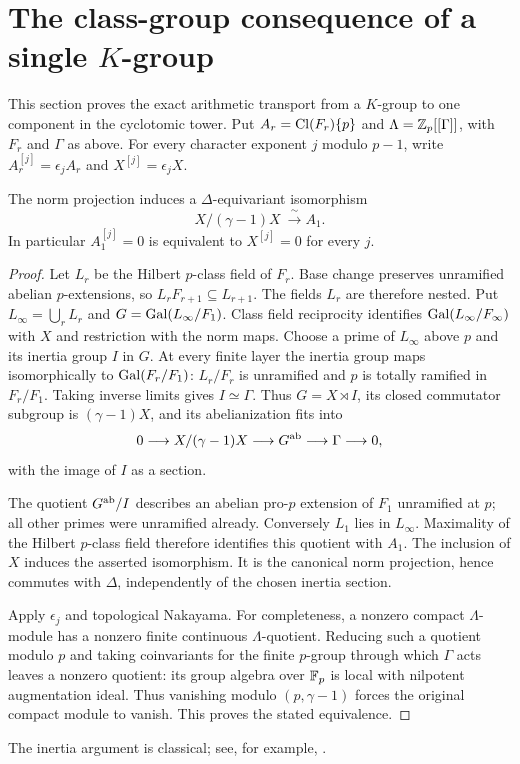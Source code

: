 \section{The class-group consequence of a single $K$-group}
This section proves the exact arithmetic transport from a $K$-group to one
component in the cyclotomic tower. Put $A_r=\operatorname{Cl}(F_r)\{p\}$ and
$\Lambda=\mathbb Z_p[[\Gamma]]$, with $F_r$ and $\Gamma$ as above.
For every character exponent $j$ modulo $p-1$, write
$A_r^{[j]}=\epsilon_j A_r$ and $X^{[j]}=\epsilon_j X$.

\begin{proposition}\label{prop:component-control}
The norm projection induces a $\Delta$-equivariant isomorphism
\[
 X/(\gamma-1)X\ \xrightarrow{\ \sim\ } A_1.
\]
In particular $A_1^{[j]}=0$ is equivalent to $X^{[j]}=0$ for every $j$.
\end{proposition}
\begin{proof}
Let $L_r$ be the Hilbert $p$-class field of $F_r$. Base change preserves
unramified abelian $p$-extensions, so $L_rF_{r+1}\subseteq L_{r+1}$.
The fields $L_r$ are therefore nested. Put $L_\infty=\bigcup_rL_r$ and
$G=\operatorname{Gal}(L_\infty/F_1)$. Class field reciprocity identifies
$\operatorname{Gal}(L_\infty/F_\infty)$ with $X$ and restriction with the norm maps.
Choose a prime of $L_\infty$ above $p$ and its inertia group $I$ in $G$.
At every finite layer the inertia group maps isomorphically to
$\operatorname{Gal}(F_r/F_1)$: $L_r/F_r$ is unramified and $p$ is totally ramified
in $F_r/F_1$. Taking inverse limits gives $I\simeq\Gamma$.
Thus $G=X\rtimes I$, its closed commutator subgroup is $(\gamma-1)X$,
and its abelianization fits into
\[
 0\longrightarrow X/(\gamma-1)X\longrightarrow G^{\rm ab}
   \longrightarrow\Gamma\longrightarrow0,
\]
with the image of $I$ as a section.

The quotient $G^{\rm ab}/I$ describes an abelian pro-$p$ extension
of $F_1$ unramified at $p$; all other primes were unramified already.
Conversely $L_1$ lies in $L_\infty$. Maximality of the Hilbert
$p$-class field therefore identifies this quotient with $A_1$.
The inclusion of $X$ induces the asserted isomorphism. It is the
canonical norm projection, hence commutes with $\Delta$, independently
of the chosen inertia section.

Apply $\epsilon_j$ and topological Nakayama. For completeness, a
nonzero compact $\Lambda$-module has a nonzero finite continuous
$\Lambda$-quotient. Reducing such a quotient modulo $p$ and taking
coinvariants for the finite $p$-group through which $\Gamma$ acts
leaves a nonzero quotient: its group algebra over $\mathbb F_p$ is local
with nilpotent augmentation ideal. Thus vanishing modulo
$(p,\gamma-1)$ forces the original compact module to vanish.
This proves the stated equivalence.
\end{proof}
The inertia argument is classical; see, for example,
\cite[\S1.3, pp.~3--4]{Wuthrich}.

